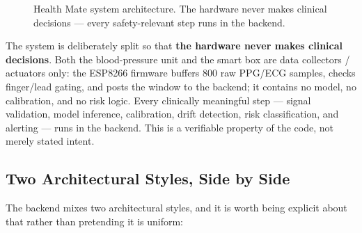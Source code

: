 \documentclass[12pt,a4paper]{report}
\begin{document}
\begin{figure}[H]
{
}%
\caption{Health Mate system architecture. The hardware never makes clinical
decisions --- every safety-relevant step runs in the backend.}
\label{fig:sysarch}
\end{figure}

The system is deliberately split so that \textbf{the hardware never makes
clinical decisions}. Both the blood-pressure unit and the smart box are data
collectors / actuators only: the ESP8266 firmware buffers 800 raw PPG/ECG
samples, checks finger/lead gating, and posts the window to the backend; it
contains no model, no calibration, and no risk logic. Every clinically
meaningful step --- signal validation, model inference, calibration, drift
detection, risk classification, and alerting --- runs in the backend. This is a
verifiable property of the code, not merely stated intent.

\subsection{Two Architectural Styles, Side by Side}

The backend mixes two architectural styles, and it is worth being explicit
about that rather than pretending it is uniform:
\end{document}
